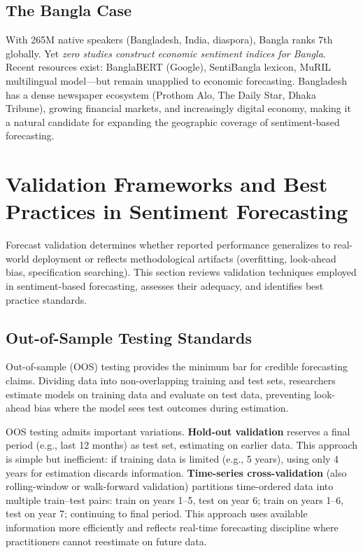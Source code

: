 \documentclass[11pt,twocolumn]{article}
\begin{document}
\subsection{The Bangla Case}

With 265M native speakers (Bangladesh, India, diaspora), Bangla ranks 7th globally. Yet \textit{zero studies construct economic sentiment indices for Bangla}. Recent resources exist: BanglaBERT (Google), SentiBangla lexicon, MuRIL multilingual model—but remain unapplied to economic forecasting. Bangladesh has a dense newspaper ecosystem (Prothom Alo, The Daily Star, Dhaka Tribune), growing financial markets, and increasingly digital economy, making it a natural candidate for expanding the geographic coverage of sentiment-based forecasting.

\section{Validation Frameworks and Best Practices in Sentiment Forecasting}

Forecast validation determines whether reported performance generalizes to real-world deployment or reflects methodological artifacts (overfitting, look-ahead bias, specification searching). This section reviews validation techniques employed in sentiment-based forecasting, assesses their adequacy, and identifies best practice standards.

\subsection{Out-of-Sample Testing Standards}

Out-of-sample (OOS) testing provides the minimum bar for credible forecasting claims. Dividing data into non-overlapping training and test sets, researchers estimate models on training data and evaluate on test data, preventing look-ahead bias where the model sees test outcomes during estimation.

OOS testing admits important variations. \textbf{Hold-out validation} reserves a final period (e.g., last 12 months) as test set, estimating on earlier data. This approach is simple but inefficient: if training data is limited (e.g., 5 years), using only 4 years for estimation discards information. \textbf{Time-series cross-validation} (also rolling-window or walk-forward validation) partitions time-ordered data into multiple train--test pairs: train on years 1--5, test on year 6; train on years 1--6, test on year 7; continuing to final period. This approach uses available information more efficiently and reflects real-time forecasting discipline where practitioners cannot reestimate on future data.
\end{document}
